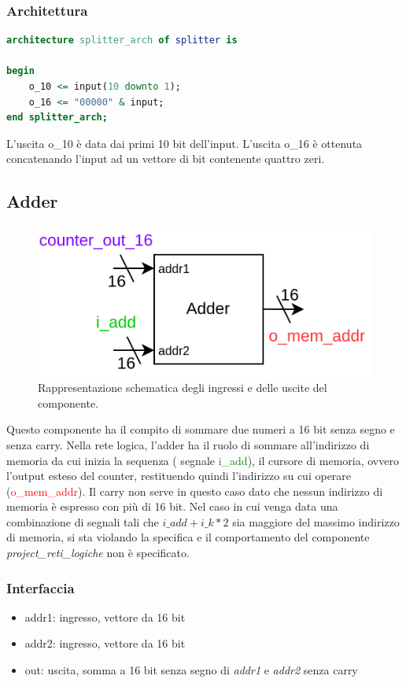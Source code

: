 \documentclass[12pt,a4paper]{scrartcl}
\begin{document}
    \subsubsection{Architettura}
        \begin{lstlisting}[language=VHDL]
architecture splitter_arch of splitter is

begin
    o_10 <= input(10 downto 1);
    o_16 <= "00000" & input;
end splitter_arch;
        \end{lstlisting}
        L'uscita o\_10 è data dai primi 10 bit dell'input.
        \newline L'uscita o\_16 è ottenuta concatenando l'input ad un vettore di bit contenente quattro zeri.
    \subsection{Adder}
        \begin{figure}[htbp]
            \centering
            \includegraphics[width=0.8\linewidth]{schema-adder.drawio.png}
            \caption{Rappresentazione schematica degli ingressi e delle uscite del componente.}
            \label{fig:componente}
        \end{figure}
        Questo componente ha il compito di sommare due numeri a 16 bit senza segno e senza carry. Nella rete logica, l'adder ha il ruolo di sommare all'indirizzo di memoria da cui inizia la sequenza ( segnale \textcolor{green}{i\_add}), il cursore di memoria, ovvero l'output esteso del counter, restituendo quindi l'indirizzo su cui operare (\textcolor{red}{o\_mem\_addr}).  
        \newline Il carry non serve in questo caso dato che nessun indirizzo di memoria è espresso con più di 16 bit. Nel caso in cui venga data una combinazione di segnali tali che \(i\_add + i\_k*2\) sia maggiore del massimo indirizzo di memoria, si sta violando la specifica e il comportamento del componente \textit{project\_reti\_logiche} non è specificato.
    \subsubsection{Interfaccia}
            \begin{itemize}
                \item addr1: ingresso, vettore da 16 bit
                \item addr2: ingresso, vettore da 16 bit
                \item out: uscita, somma a 16 bit senza segno di \textit{addr1} e \textit{addr2} senza carry
            \end{itemize}
    \newpage
\end{document}
